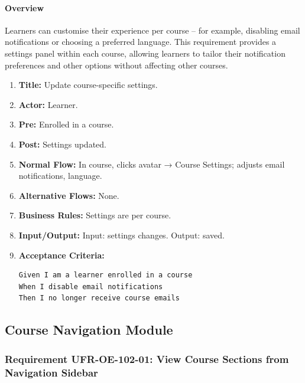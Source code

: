\paragraph{Overview}
Learners can customise their experience per course – for example, disabling email notifications or choosing a preferred language. This requirement provides a settings panel within each course, allowing learners to tailor their notification preferences and other options without affecting other courses.
\begin{enumerate}[label=\textbf{\arabic*.}]
\item \textbf{Title:} Update course-specific settings.
\item \textbf{Actor:} Learner.
\item \textbf{Pre:} Enrolled in a course.
\item \textbf{Post:} Settings updated.
\item \textbf{Normal Flow:} In course, clicks avatar → Course Settings; adjusts email notifications, language.
\item \textbf{Alternative Flows:} None.
\item \textbf{Business Rules:} Settings are per course.
\item \textbf{Input/Output:} Input: settings changes. Output: saved.
\item \textbf{Acceptance Criteria:}
    \begin{verbatim}
Given I am a learner enrolled in a course
When I disable email notifications
Then I no longer receive course emails
    \end{verbatim}
\end{enumerate}

\subsection{Course Navigation Module}
\subsubsection{Requirement UFR-OE-102-01: View Course Sections from Navigation Sidebar}

